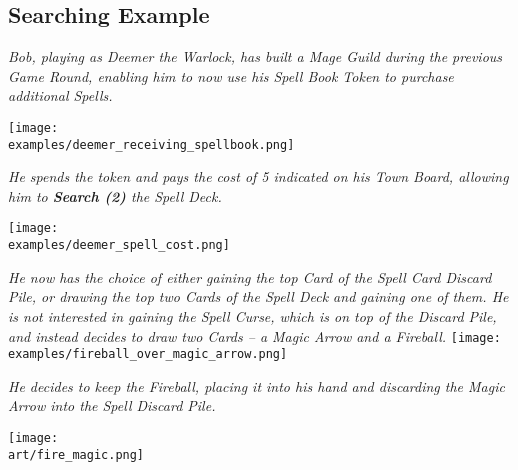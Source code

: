 \begin{multicols*}{2}
{  \subsection*{Searching Example}
  \textit{Bob, playing as Deemer the Warlock, has built a Mage Guild during the previous Game Round, enabling him to now use his Spell Book Token to purchase additional Spells.}\par
  \texttt{[image: \\examples/deemer\_receiving\_spellbook.png]}\par
  \textit{He spends the token and pays the cost of 5  indicated on his Town Board, allowing him to \textbf{Search (2)} the Spell Deck.}\par
  \texttt{[image: \\examples/deemer\_spell\_cost.png]}\par
  \filbreak
  \textit{He now has the choice of either gaining the top Card of the Spell Card Discard Pile, or drawing the top two Cards of the Spell Deck and gaining one of them.
  He is not interested in gaining the Spell Curse, which is on top of the Discard Pile, and instead decides to draw two Cards – a Magic Arrow and a Fireball.}
  \texttt{[image: \\examples/fireball\_over\_magic\_arrow.png]}\par
  \textit{He decides to keep the Fireball, placing it into his hand and discarding the Magic Arrow into the Spell Discard Pile.}
}
\pl{}

\vspace*{\fill}

\hfill\texttt{[image: \\art/fire\_magic.png]}

\end{multicols*}
